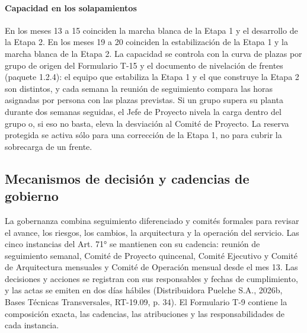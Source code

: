 \paragraph{Capacidad en los solapamientos} En los meses 13 a 15 coinciden la marcha blanca de la Etapa 1 y el desarrollo de la Etapa 2. En los meses 19 a 20 coinciden la estabilización de la Etapa 1 y la marcha blanca de la Etapa 2. La capacidad se controla con la curva de plazas por grupo de origen del Formulario T-15 y el documento de nivelación de frentes (paquete 1.2.4): el equipo que estabiliza la Etapa 1 y el que construye la Etapa 2 son distintos, y cada semana la reunión de seguimiento compara las horas asignadas por persona con las plazas previstas. Si un grupo supera su planta durante dos semanas seguidas, el Jefe de Proyecto nivela la carga dentro del grupo o, si eso no basta, eleva la desviación al Comité de Proyecto. La reserva protegida se activa sólo para una corrección de la Etapa 1, no para cubrir la sobrecarga de un frente.

\subsection{Mecanismos de decisión y cadencias de gobierno}

La gobernanza combina seguimiento diferenciado y comités formales para revisar el avance, los riesgos, los cambios, la arquitectura y la operación del servicio. Las cinco instancias del Art. 71° se mantienen con su cadencia: reunión de seguimiento semanal, Comité de Proyecto quincenal, Comité Ejecutivo y Comité de Arquitectura mensuales y Comité de Operación mensual desde el mes 13. Las decisiones y acciones se registran con sus responsables y fechas de cumplimiento, y las actas se emiten en dos días hábiles (Distribuidora Puelche S.A., 2026b, Bases Técnicas Transversales, RT-19.09, p. 34). El Formulario T-9 contiene la composición exacta, las cadencias, las atribuciones y las responsabilidades de cada instancia.

